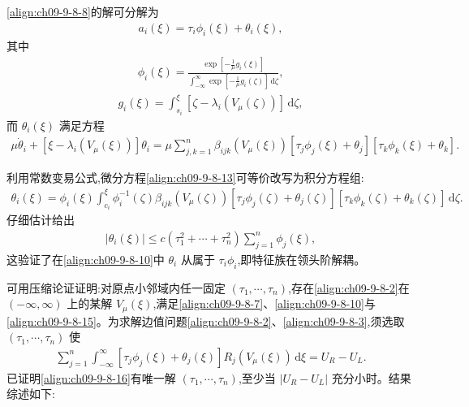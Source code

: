 \documentclass[../../main.tex]{subfiles}
\begin{document}
\eqref{align:ch09-9-8-8}的解可分解为
\begin{align}
a_{i}(\xi)=\tau_{i}\phi_{i}(\xi)+\theta_{i}(\xi),
\label{align:ch09-9-8-10}
\end{align}
其中
\begin{align}
\phi_{i}(\xi)=\frac{\exp[-\frac{1}{\mu}g_{i}(\xi)]}{\int_{-\infty}^{\infty}\exp[-\frac{1}{\mu}g_{i}(\zeta)]\,\mathrm{d}\zeta},
\label{align:ch09-9-8-11}
\end{align}
\begin{align}
g_{i}(\xi)=\int_{s_{i}}^{\xi}[\zeta-\lambda_{i}(V_{\mu}(\zeta))]\,\mathrm{d}\zeta,
\label{align:ch09-9-8-12}
\end{align}
而 $\theta_{i}(\xi)$ 满足方程
\begin{align}
\mu\dot{\theta}_{i}+[\xi-\lambda_{i}(V_{\mu}(\xi))]\theta_{i}
=\mu\sum_{j,k=1}^{n}\beta_{ijk}(V_{\mu}(\xi))[\tau_{j}\phi_{j}(\xi)+\theta_{j}][\tau_{k}\phi_{k}(\xi)+\theta_{k}].
\label{align:ch09-9-8-13}
\end{align}

利用常数变易公式,微分方程\eqref{align:ch09-9-8-13}可等价改写为积分方程组:
\begin{align}
\theta_{i}(\xi)=\phi_{i}(\xi)\int_{c_{i}}^{\xi}\phi_{i}^{-1}(\zeta)\beta_{ijk}(V_{\mu}(\zeta))[\tau_{j}\phi_{j}(\zeta)+\theta_{j}(\zeta)][\tau_{k}\phi_{k}(\zeta)+\theta_{k}(\zeta)]\,\mathrm{d}\zeta.
\label{align:ch09-9-8-14}
\end{align}
仔细估计给出
\begin{align}
|\theta_{i}(\xi)|\leqslant c(\tau_{1}^{2}+\cdots+\tau_{n}^{2})\sum_{j=1}^{n}\phi_{j}(\xi),
\label{align:ch09-9-8-15}
\end{align}
这验证了在\eqref{align:ch09-9-8-10}中 $\theta_{i}$ 从属于 $\tau_{i}\phi_{i}$,即特征族在领头阶解耦。

可用压缩论证证明:对原点小邻域内任一固定 $(\tau_{1},\cdots ,\tau_{n})$,存在\eqref{align:ch09-9-8-2}在 $(-\infty,\infty)$ 上的某解 $V_{\mu}(\xi)$,满足\eqref{align:ch09-9-8-7}、\eqref{align:ch09-9-8-10}与\eqref{align:ch09-9-8-15}。为求解边值问题\eqref{align:ch09-9-8-2}、\eqref{align:ch09-9-8-3},须选取 $(\tau_{1},\cdots ,\tau_{n})$ 使
\begin{align}
\sum_{j=1}^{n}\int_{-\infty}^{\infty}[\tau_{j}\phi_{j}(\xi)+\theta_{j}(\xi)]R_{j}(V_{\mu}(\xi))\,\mathrm{d}\xi=U_{R}-U_{L}.
\label{align:ch09-9-8-16}
\end{align}
已证明\eqref{align:ch09-9-8-16}有唯一解 $(\tau_{1},\cdots ,\tau_{n})$,至少当 $|U_{R}-U_{L}|$ 充分小时。结果综述如下:
\end{document}
